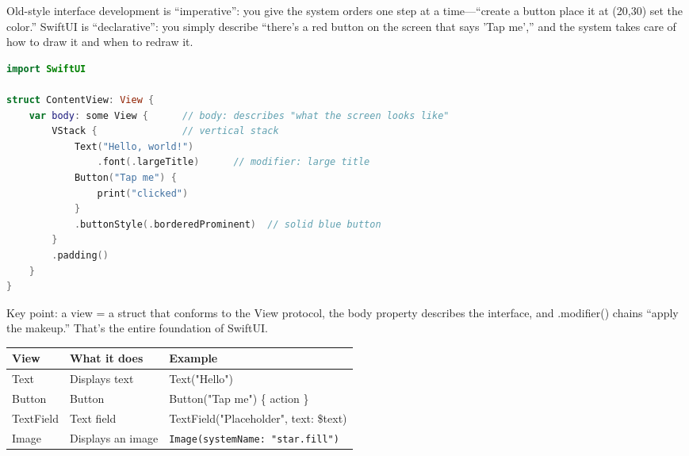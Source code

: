 


Old-style interface development is “imperative”: you give the system orders one step at a time—“create a button place it at (20,30) set the color.” SwiftUI is “declarative”: you simply describe “there's a red button on the screen that says 'Tap me',” and the system takes care of how to draw it and when to redraw it.

\begin{lstlisting}[language=Swift]
import SwiftUI

struct ContentView: View {
    var body: some View {      // body: describes "what the screen looks like"
        VStack {               // vertical stack
            Text("Hello, world!")
                .font(.largeTitle)      // modifier: large title
            Button("Tap me") {
                print("clicked")
            }
            .buttonStyle(.borderedProminent)  // solid blue button
        }
        .padding()
    }
}
\end{lstlisting}

Key point: a view = a struct that conforms to the View protocol, the body property describes the interface, and .modifier() chains “apply the makeup.” That's the entire foundation of SwiftUI.


\begin{center}
\begin{tabularx}{\linewidth}{|X|X|X|}
\hline
\textbf{View} & \textbf{What it does} & \textbf{Example} \tabularnewline
\hline
Text & Displays text & Text("Hello") \tabularnewline
Button & Button & Button("Tap me") \{ action \} \tabularnewline
TextField & Text field & TextField("Placeholder", text: \$text) \tabularnewline
Image & Displays an image & \texttt{Image(systemName: "star.\allowbreak fill")} \tabularnewline
\hline
\end{tabularx}
\end{center}

